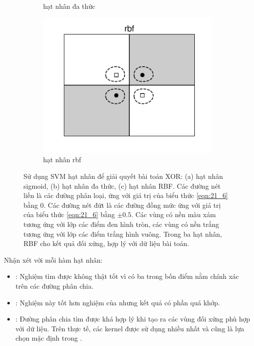 \begin{figure}[t]
\begin{subfigure}{0.325\textwidth}
    \caption{hạt nhân đa thức}
    \end{subfigure}
    \begin{subfigure}{0.325\textwidth}
    \includegraphics[width=\linewidth]{Chapters/09_SupportVectorMachines/21_kernelsvm/plt/rbf1.pdf}
    \caption{hạt nhân rbf}
    \end{subfigure}

    \caption{
    Sử dụng SVM hạt nhân để giải quyết bài toán XOR: (a) hạt nhân sigmoid, (b)
 hạt nhân đa thức, (c) hạt nhân RBF. Các đường nét liền là các đường phân loại,
    ứng với giá trị của biểu thức \eqref{eqn:21_6} bằng 0. Các đường nét đứt là
    các đường đồng mức ứng với giá trị của biểu thức \eqref{eqn:21_6} bằng $\pm
    0.5$. Các vùng có nền màu xám tương ứng với lớp các điểm đen hình tròn, các
    vùng có nền trắng tương ứng với lớp các điểm trắng hình vuông. Trong ba
    hạt nhân, RBF cho kết quả đối xứng, hợp lý
    với dữ liệu bài toán. }
    \label{fig:21_2}
\end{figure}
 
Nhận xét với mỗi hàm hạt nhân: 
\begin{itemize}
    \item {}: Nghiệm tìm được không thật tốt vì có ba trong
    bốn điểm nằm chính xác trên các đường phân chia. 

    \item {}: Nghiệm này tốt hơn nghiệm của
     nhưng kết quả có phần quá khớp. 
     
    \item {}: Đường phân
    chia tìm được khá hợp lý khi tạo ra các vùng đối xứng phù hợp với dữ liệu. Trên thực tế, các  kernel được sử dụng nhiều nhất và cũng là lựa chọn mặc định trong . 
\end{itemize}
 
